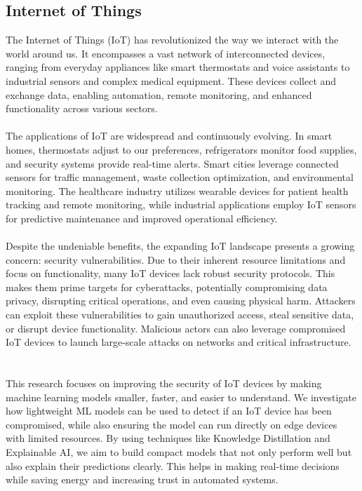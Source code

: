 \documentclass[conference,letterpaper]{IEEEtran}
\begin{document}
\subsection{Internet of Things}
The Internet of Things (IoT) has revolutionized the way we interact with the world around us. It encompasses a vast network of interconnected devices, ranging from everyday appliances like smart thermostats and voice assistants to industrial sensors and complex medical equipment. These devices collect and exchange data, enabling automation, remote monitoring, and enhanced functionality across various sectors.
~\\
~\\
The applications of IoT are widespread and continuously evolving. In smart homes, thermostats adjust to our preferences, refrigerators monitor food supplies, and security systems provide real-time alerts. Smart cities leverage connected sensors for traffic management, waste collection optimization, and environmental monitoring. The healthcare industry utilizes wearable devices for patient health tracking and remote monitoring, while industrial applications employ IoT sensors for predictive maintenance and improved operational efficiency.
~\\
~\\
Despite the undeniable benefits, the expanding IoT landscape presents a growing concern: security vulnerabilities. Due to their inherent resource limitations and focus on functionality, many IoT devices lack robust security protocols. This makes them prime targets for cyberattacks, potentially compromising data privacy, disrupting critical operations, and even causing physical harm. Attackers can exploit these vulnerabilities to gain unauthorized access, steal sensitive data, or disrupt device functionality. Malicious actors can also leverage compromised IoT devices to launch large-scale attacks on networks and critical infrastructure.
~\\
~\\
This research focuses on improving the security of IoT devices by making machine learning models smaller, faster, and easier to understand. We investigate how lightweight ML models can be used to detect if an IoT device has been compromised, while also ensuring the model can run directly on edge devices with limited resources. By using techniques like Knowledge Distillation and Explainable AI, we aim to build compact models that not only perform well but also explain their predictions clearly. This helps in making real-time decisions while saving energy and increasing trust in automated systems.
\end{document}
